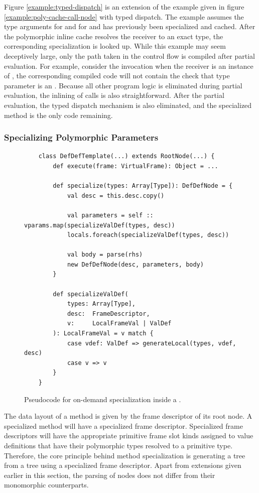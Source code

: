 Figure \ref{example:typed-dispatch} is an extension of the example given in figure \ref{example:poly-cache-call-node} with typed dispatch.
The example assumes the type arguments for  and  for  and  has previously been specialized and cached.
After the polymorphic inline cache resolves the receiver to an exact type, the corresponding specialization is looked up.
While this example may seem deceptively large, only the path taken in the control flow is compiled after partial evaluation.
For example, consider the invocation  when the receiver is an instance of , the corresponding compiled code will not contain the check that type parameter is an .
Because all other program logic is eliminated during partial evaluation, the inlining of calls is also straightforward.
After the partial evaluation, the typed dispatch mechanism is also eliminated, and the specialized method is the only code remaining.

\subsubsection*{Specializing Polymorphic Parameters}
\begin{figure}[!htb]
	\begin{verbatim}
	class DefDefTemplate(...) extends RootNode(...) {
		def execute(frame: VirtualFrame): Object = ...
			
		def specialize(types: Array[Type]): DefDefNode = {
			val desc = this.desc.copy()
				
			val parameters = self :: vparams.map(specializeValDef(types, desc))
			locals.foreach(specializeValDef(types, desc))
				
			val body = parse(rhs)
			new DefDefNode(desc, parameters, body)
		}
	
		def specializeValDef(
			types: Array[Type], 
			desc:  FrameDescriptor, 
			v:     LocalFrameVal | ValDef
		): LocalFrameVal = v match {
			case vdef: ValDef => generateLocal(types, vdef, desc)
			case v => v
		}
	}
	\end{verbatim}
	\caption{Pseudocode for on-demand specialization inside a .}
	\label{impl:defdeftemplate-specialize}
\end{figure}

The data layout of a method is given by the frame descriptor of its root node.
A specialized method will have a specialized frame descriptor.
Specialized frame descriptors will have the appropriate primitive frame slot kinds assigned to value definitions that have their polymorphic types resolved to a primitive type.
Therefore, the core principle behind method specialization is generating a  tree from a  tree using a specialized frame descriptor.
Apart from extensions given earlier in this section, the parsing of  nodes does not differ from their monomorphic counterparts.

